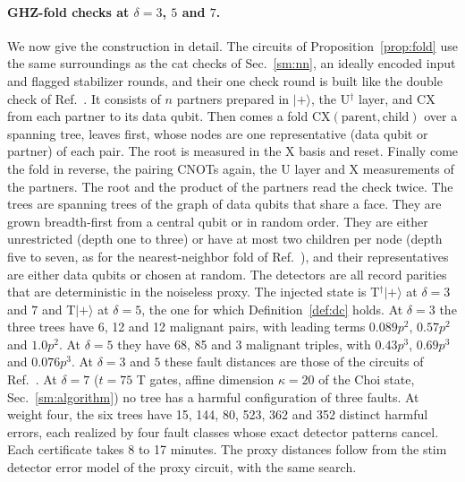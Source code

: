 \documentclass[aps,prl,reprint,twocolumn,amsmath,amssymb,floatfix,nofootinbib,superscriptaddress]{revtex4-2}
\theoremstyle{definition}
\theoremstyle{remark}
\begin{document}
\paragraph*{GHZ-fold checks at $\delta=3$, $5$ and $7$.}
We now give the construction in detail. The circuits of Proposition~\ref{prop:fold} use the same surroundings as the cat checks of Sec.~\ref{sm:nn}, an ideally encoded input and flagged stabilizer rounds, and their one check round is built like the double check of Ref.~\cite{cultivation}. It consists of $n$ partners prepared in $|{+}\rangle$, the U$^\dagger$ layer, and $\mathrm{CX}$ from each partner to its data qubit. Then comes a fold $\mathrm{CX}(\text{parent},\text{child})$ over a spanning tree, leaves first, whose nodes are one representative (data qubit or partner) of each pair. The root is measured in the X basis and reset. Finally come the fold in reverse, the pairing CNOTs again, the U layer and X measurements of the partners. The root and the product of the partners read the check twice. The trees are spanning trees of the graph of data qubits that share a face. They are grown breadth-first from a central qubit or in random order. They are either unrestricted (depth one to three) or have at most two children per node (depth five to seven, as for the nearest-neighbor fold of Ref.~\cite{cultivation}), and their representatives are either data qubits or chosen at random. The detectors are all record parities that are deterministic in the noiseless proxy. The injected state is T$^\dagger|{+}\rangle$ at $\delta=3$ and $7$ and T$|{+}\rangle$ at $\delta=5$, the one for which Definition~\ref{def:dc} holds. At $\delta=3$ the three trees have 6, 12 and 12 malignant pairs, with leading terms $0.089p^2$, $0.57p^2$ and $1.0p^2$. At $\delta=5$ they have 68, 85 and 3 malignant triples, with $0.43p^3$, $0.69p^3$ and $0.076p^3$. At $\delta=3$ and $5$ these fault distances are those of the circuits of Ref.~\cite{cultivation}. At $\delta=7$ ($t=75$ T gates, affine dimension $\kappa=20$ of the Choi state, Sec.~\ref{sm:algorithm}) no tree has a harmful configuration of three faults. At weight four, the six trees have 15, 144, 80, 523, 362 and 352 distinct harmful errors, each realized by four fault classes whose exact detector patterns cancel. Each certificate takes 8 to 17 minutes. The proxy distances follow from the stim detector error model of the proxy circuit, with the same search.
\end{document}
